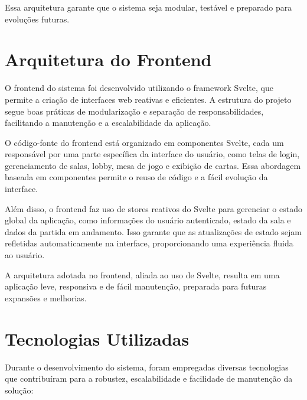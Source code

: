 Essa arquitetura garante que o sistema seja modular, testável e preparado para evoluções futuras.

\section{Arquitetura do Frontend}
O frontend do sistema foi desenvolvido utilizando o framework Svelte, que permite a criação de interfaces web reativas e eficientes. A estrutura do projeto segue boas práticas de modularização e separação de responsabilidades, facilitando a manutenção e a escalabilidade da aplicação.

O código-fonte do frontend está organizado em componentes Svelte, cada um responsável por uma parte específica da interface do usuário, como telas de login, gerenciamento de salas, lobby, mesa de jogo e exibição de cartas. Essa abordagem baseada em componentes permite o reuso de código e a fácil evolução da interface.

Além disso, o frontend faz uso de stores reativos do Svelte para gerenciar o estado global da aplicação, como informações do usuário autenticado, estado da sala e dados da partida em andamento. Isso garante que as atualizações de estado sejam refletidas automaticamente na interface, proporcionando uma experiência fluida ao usuário.

A arquitetura adotada no frontend, aliada ao uso de Svelte, resulta em uma aplicação leve, responsiva e de fácil manutenção, preparada para futuras expansões e melhorias.

\section{Tecnologias Utilizadas}
Durante o desenvolvimento do sistema, foram empregadas diversas tecnologias que contribuíram para a robustez, escalabilidade e facilidade de manutenção da solução:

